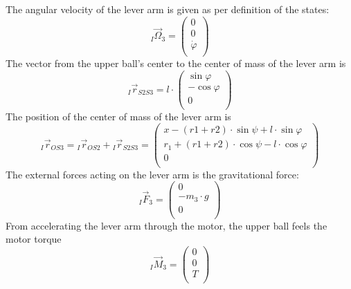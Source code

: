 \documentclass{article}
\begin{document}
The angular velocity of the lever arm is given as per definition of the states:
\begin{equation}
{}_I \vec{\Omega}_3 =
\left( {\begin{array}{c} 0 \\ 0 \\ \dot{\varphi} \\ \end{array} } \right)
\end{equation}
The vector from the upper ball's center to the center of mass of the lever arm is
\begin{equation}
{}_I \vec{r}_{S2S3} =
l \cdot \left( {\begin{array}{c} \sin{\varphi} \\ -\cos{\varphi} \\ 0 \\ \end{array} } \right)
\end{equation}
The position of the center of mass of the lever arm is
\begin{equation}
{}_I \vec{r}_{OS3} = {}_I \vec{r}_{OS2} + {}_I \vec{r}_{S2S3} =
\left( {\begin{array}{c} x - (r1+r2) \cdot \sin{\psi} + l \cdot \sin{\varphi} \\ r_1 + (r1+r2) \cdot \cos{\psi} - l \cdot \cos{\varphi} \\ 0 \\ \end{array} } \right)
\end{equation}
The external forces acting on the lever arm is the gravitational force:
\begin{equation}
{}_I \vec{F}_{3} = \left( {\begin{array}{c} 0 \\ -m_3 \cdot g \\ 0 \\ \end{array} } \right)
\end{equation}
From accelerating the lever arm through the motor, the upper ball feels the motor torque
\begin{equation}
{}_I \vec{M}_{3} = \left( {\begin{array}{c} 0 \\ 0 \\ T \\ \end{array} } \right)
\end{equation}
\end{document}
